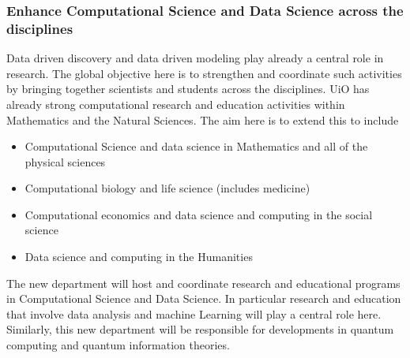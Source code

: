 \documentclass{beamer}
\begin{document}
\begin{frame}
\frametitle{Enhance Computational Science and Data Science across the disciplines}

Data driven discovery and data driven modeling play already a central role in research. The global objective here is to strengthen and coordinate such activities by bringing together scientists and students across the disciplines.
UiO has already strong computational research and education activities within Mathematics and the Natural Sciences.
The aim here is to extend this to include

\begin{itemize}
\item Computational Science and data science in Mathematics and all of the physical sciences

\item Computational biology and life science (includes medicine)

\item Computational economics and data science and computing in the social science

\item Data science and computing in the Humanities
\end{itemize}

\noindent
The new department will host and coordinate research and educational programs in Computational Science and Data Science. In particular research and education that involve  data analysis and machine Learning will play a central role here. Similarly, this new department will be responsible for developments in quantum computing and quantum information theories.
\end{frame}
\end{document}
